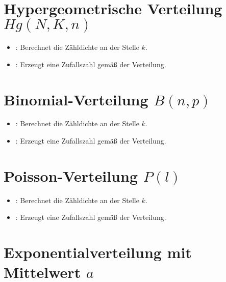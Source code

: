 \section{Hypergeometrische Verteilung \texorpdfstring{$Hg(N,K,n)$}{Hg(N,K,n)}}

\begin{itemize}

\item
{}:
Berechnet die Zähldichte an der Stelle $k$.

\item
{}:
Erzeugt eine Zufallszahl gemäß der Verteilung.

\end{itemize}



\section{Binomial-Verteilung \texorpdfstring{$B(n,p)$}{B(n,p)}}



\begin{itemize}

\item
{}:
Berechnet die Zähldichte an der Stelle $k$.


\item
{}:
Erzeugt eine Zufallszahl gemäß der Verteilung.

\end{itemize}



\section{Poisson-Verteilung \texorpdfstring{$P(l)$}{P(l)}}

\begin{itemize}

\item
{}:
Berechnet die Zähldichte an der Stelle $k$.

\item
{}:
Erzeugt eine Zufallszahl gemäß der Verteilung.

\end{itemize}



\section{Exponentialverteilung mit Mittelwert \texorpdfstring{$a$}{a}}


